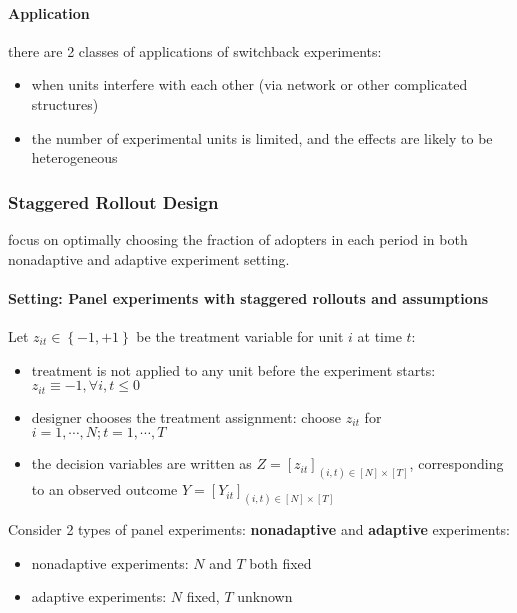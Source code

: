 \documentclass[twoside]{article}
\begin{document}
\paragraph{Application} there are 2 classes of applications of switchback experiments:
\begin{itemize}
    \item when units interfere with each other (via network or other complicated structures)
    \item the number of experimental units is limited, and the effects are likely to be heterogeneous
\end{itemize}

\subsubsection{Staggered Rollout Design}

\citet{xiong2024optimal} focus on optimally choosing the fraction of adopters in each period in both nonadaptive and adaptive experiment setting.

\paragraph*{Setting: Panel experiments with staggered rollouts and assumptions} 
Let $z_{it}\in \left\{-1,+1\right\}$ be the treatment variable for unit $i$ at time $t$:
\begin{itemize}
    \item treatment is not applied to any unit before the experiment starts: $z_{it}\equiv -1,\forall i,t\leq 0$
    \item designer chooses the treatment assignment: choose $z_{it}$ for $i=1,\cdots,N;t=1,\cdots,T$
    \item the decision variables are written as $Z=[z_{it}]_{(i,t)\in[N]\times [T]}$, corresponding to an observed outcome $Y=[Y_{it}]_{(i,t)\in[N]\times[T]}$
\end{itemize}
Consider 2 types of panel experiments: \textbf{nonadaptive} and \textbf{adaptive} experiments:
\begin{itemize}
    \item nonadaptive experiments: $N$ and $T$ both fixed
    \item adaptive experiments: $N$ fixed, $T$ unknown
\end{itemize}
\end{document}
